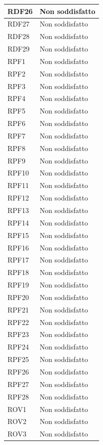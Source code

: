 \begin{longtable}{| p{2.5cm} | p{3cm} |}
	RDF26 & Non soddisfatto \\ \hline
	RDF27 & Non soddisfatto \\ \hline
	RDF28 & Non soddisfatto \\ \hline
	RDF29 & Non soddisfatto \\ \hline
	RPF1 & Non soddisfatto \\ \hline
	RPF2 & Non soddisfatto \\ \hline
	RPF3 & Non soddisfatto \\ \hline
	RPF4 & Non soddisfatto \\ \hline
	RPF5 & Non soddisfatto \\ \hline
	RPF6 & Non soddisfatto \\ \hline
	RPF7 & Non soddisfatto \\ \hline
	RPF8 & Non soddisfatto \\ \hline
	RPF9 & Non soddisfatto \\ \hline
	RPF10 & Non soddisfatto \\ \hline
	RPF11 & Non soddisfatto \\ \hline
	RPF12 & Non soddisfatto \\ \hline
	RPF13 & Non soddisfatto \\ \hline
	RPF14 & Non soddisfatto \\ \hline
	RPF15 & Non soddisfatto \\ \hline
	RPF16 & Non soddisfatto \\ \hline
	RPF17 & Non soddisfatto \\ \hline
	RPF18 & Non soddisfatto \\ \hline
	RPF19 & Non soddisfatto \\ \hline
	RPF20 & Non soddisfatto \\ \hline
	RPF21 & Non soddisfatto \\ \hline
	RPF22 & Non soddisfatto \\ \hline
	RPF23 & Non soddisfatto \\ \hline
	RPF24 & Non soddisfatto \\ \hline
	RPF25 & Non soddisfatto \\ \hline
	RPF26 & Non soddisfatto \\ \hline
	RPF27 & Non soddisfatto \\ \hline
	RPF28 & Non soddisfatto \\ \hline
	ROV1 & Non soddisfatto \\ \hline
	ROV2 & Non soddisfatto \\ \hline
	ROV3 & Non soddisfatto \\ \hline

\end{longtable}
